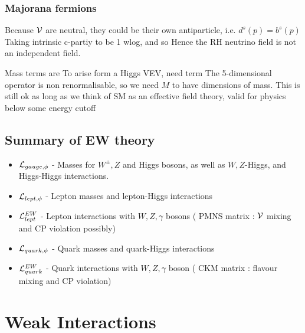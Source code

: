 \documentclass{article}
\begin{document}
\subsubsection*{Majorana fermions}
Because $\mathcal{V}$ are neutral, they could be their own antiparticle, i.e. $d^s(p) = b^s(p)$
Taking intrinsic c-partiy to be 1 wlog, 
and so 
Hence the RH neutrino field is not an independent field.

Mass terms are 
To arise form a Higgs VEV, need term 
The 5-dimensional operator is non renormalisable, so we need $M$ to have dimensions of mass. This is still ok as long as we think of SM as an effective field theory, valid for physics below some energy cutoff

\subsection{Summary of EW theory}
\begin{itemize}
    \item $\mathcal{L}_{gauge, \phi}$ - Masses for $W^\pm, Z$ and Higgs bosons, as well as $W,Z$-Higgs, and Higgs-Higgs interactions. 
    \item $\mathcal{L}_{lept, \phi}$ - Lepton masses and lepton-Higgs interactions 
    \item $\mathcal{L}_{lept}^{EW}$ - Lepton interactions with $W,Z,\gamma$ bosons ( PMNS matrix : $\mathcal{V}$ mixing and CP violation possibly) 
    \item $\mathcal{L}_{quark, \phi}$ - Quark masses and quark-Higgs interactions 
    \item $\mathcal{L}_{quark}^{EW}$ - Quark interactions with $W,Z,\gamma$ boson ( CKM matrix : flavour mixing and CP violation)
\end{itemize}

\section{Weak Interactions}
\end{document}
